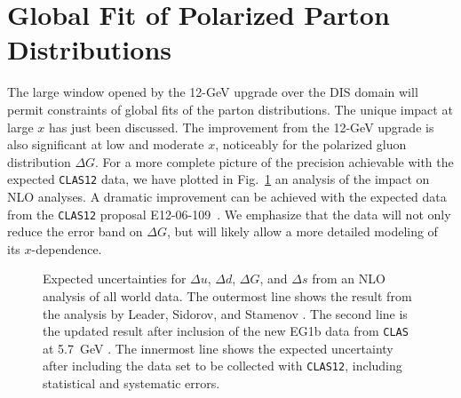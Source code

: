 \section{Global Fit of Polarized Parton Distributions}

The large window opened by the 12-GeV upgrade over the DIS domain will permit 
constraints of global fits of the parton distributions.  The unique impact at 
large $x$ has just been discussed.  The improvement from the 12-GeV upgrade is 
also significant at low and moderate $x$, noticeably for the polarized gluon 
distribution $\Delta G$.  For a more complete picture of the precision 
achievable with the expected {\tt CLAS12} data, we have plotted in 
Fig.~\ref{pPDFs_exp} an analysis of the impact on NLO analyses.  A dramatic 
improvement can be achieved with the expected data from the {\tt CLAS12} 
proposal E12-06-109~\cite{EG12}.  We emphasize that the data will not only 
reduce the error band on $\Delta G$, but will likely allow a more detailed 
modeling of its $x$-dependence.

\begin{figure}[htbp]
\vspace{8.5cm}
\caption{\small{Expected uncertainties for $\Delta u$, $\Delta d$, $\Delta G$,
and $\Delta s$ from an NLO analysis of all world data.  The outermost line 
shows the result from the analysis by Leader, Sidorov, and Stamenov
.  The second line is the updated result after 
inclusion of the new EG1b data from {\tt CLAS} at 5.7~GeV
.  The innermost line shows the expected 
uncertainty after including the data set to be collected with {\tt CLAS12}, 
including statistical and systematic errors.}}
\label{pPDFs_exp}
\end{figure}

